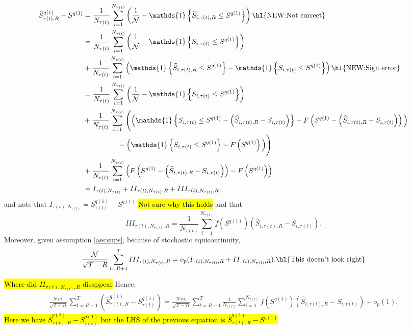 \begin{align*}
\widehat{S}_{\tau(t),R}^{q(1)}-S^{q(1)}
&=\frac{1}{N_{\tau(t)}}\sum_{i=1}^{N_{\tau(t)}}\left( \frac{1}{\mathcal{N}}-\mathds{1}\left\{ \widehat{S}_{i,\tau(t),R}\leq S^{q(1)}\right\} \right) \text{\hl{NEW:Not correct}} \\
&=\frac{1}{N_{\tau(t)}}\sum_{i=1}^{N_{\tau(t)}}\left( \frac{1}{\mathcal{N}}-\mathds{1}\left\{ S_{i,\tau(t)}\leq S^{q(1)}\right\} \right) \\
&+\frac{1}{N_{\tau(t)}}\sum_{i=1}^{N_{\tau(t)}}\left( \mathds{1}\left\{ \widehat{S}_{i,\tau(t),R}\leq S^{q(1)}\right\} -\mathds{1}\left\{ S_{i,\tau(t)}\leq S^{q(1)}\right\} \right) \text{\hl{NEW:Sign error}} \\
&=\frac{1}{N_{\tau(t)}}\sum_{i=1}^{N_{\tau(t)}}\left( \frac{1}{\mathcal{N}}-\mathds{1}\left\{ S_{i,\tau(t)}\leq S^{q(1)}\right\} \right) \\
&+\frac{1}{N_{\tau(t)}}\sum_{i=1}^{N_{\tau(t)}}\Bigg( \Big( \mathds{1}\left\{ S_{i,\tau(t)}\leq S^{q(1)} -\left( \widehat{S}_{i,\tau(t),R}-S_{i,\tau(t)}\right)\right\} -F\left( S^{q(1)}-\left( \widehat{S}_{i,\tau(t),R}-S_{i,\tau(t)}\right) \right) \Big) \\
&\hspace{1.7cm} -\Big( \mathds{1}\left\{ S_{i,\tau(t)}\leq S^{q(1)}\right\} - F\left( S^{q(1)}\right) \Big) \Bigg) \\
&+\frac{1}{N_{\tau(t)}}\sum_{i=1}^{N_{\tau(t)}}\left( F\left( S^{q(1)}-\left( \widehat{S}_{i,\tau(t),R}-S_{i,\tau(t)}\right) \right) -F\left( S^{q(1)}\right) \right) \\
&=I_{\tau(t),N_{\tau(t)}}+II_{\tau(t),N_{\tau(t)},R}+III_{\tau(t),N_{\tau(t)},R}.
\end{align*}
and note that $I_{\tau(t),N_{\tau(t)}}=S_{\tau(t)}^{q(1)}-S^{q(1)}$ \hl{Not sure why this holds} and that
\begin{equation*}
III_{\tau(t),N_{\tau(t)},R}=\frac{1}{N_{\tau(t)}}\sum_{i=1}^{N_{\tau(t)}}f\left( S^{q(1)}\right) \left( \widehat{S}_{i,\tau(t),R}-S_{i,\tau(t)}\right).
\end{equation*}
Moreover, given assumption \ref{ass:sups}, because of stochastic equicontinuity,
\begin{equation*}
\frac{\mathcal{N}}{\sqrt{T-R}}\sum_{t=R+1}^{T}III_{\tau(t),N_{\tau(t)},R}=o_{p}(I_{\tau(t),N_{\tau(t)},R} + II_{\tau(t),N_{\tau(t)},R}). \text{\hl{This doesn't look right}}
\end{equation*}

\hl{Where did $II_{\tau(t),N_{\tau(t)},R}$ disappear} Hence,
\begin{align*}
\frac{\mathcal{N}m_{1}}{\sqrt{T-R}}\sum_{t=R+1}^{T}\left( \widehat{S}_{\tau(t),R}^{q(1)}-S_{\tau(t)}^{q(1)}\right)
=\frac{\mathcal{N}m_{1}}{\sqrt{T-R}}\sum_{t=R+1}^{T}\frac{1}{N_{\tau(t)}}\sum_{i=1}^{N_{\tau(t)}}f\left( S^{q(1)}\right) \left( \widehat{S}_{i,\tau(t),R}-S_{i,\tau(t)}\right) +o_{p}(1).
\end{align*}
\hl{Here we have $\widehat{S}_{\tau(t),R}^{q(1)}-S_{\tau(t)}^{q(1)}$ but the LHS of the previous equation is $\widehat{S}_{\tau(t),R}^{q(1)}-S^{q(1)}$}

